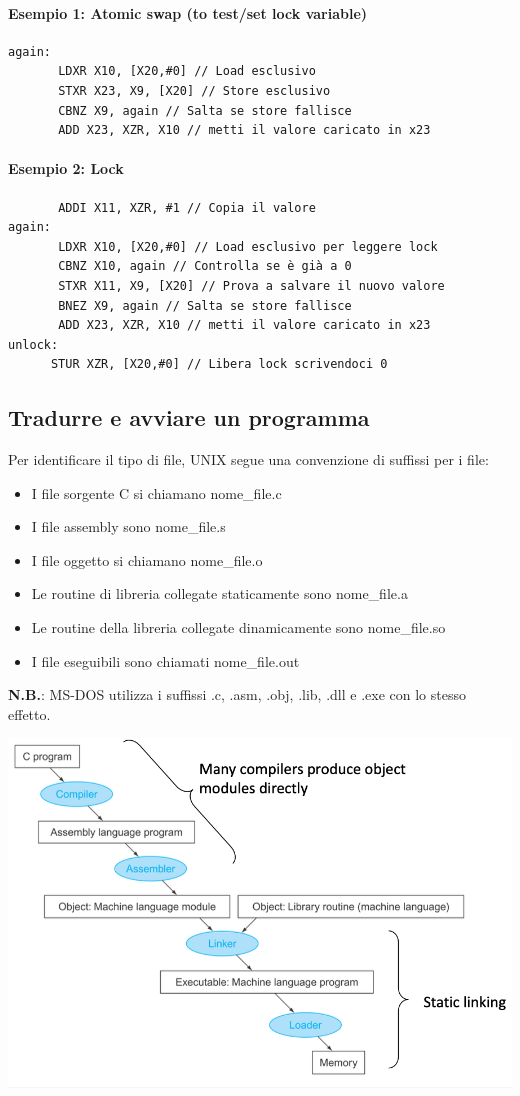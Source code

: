\documentclass[12pt,a4paper]{article}
\begin{document}
\paragraph{Esempio 1: Atomic swap (to test/set lock variable)}
\begin{verbatim}
again:
       LDXR X10, [X20,#0] // Load esclusivo
       STXR X23, X9, [X20] // Store esclusivo
       CBNZ X9, again // Salta se store fallisce
       ADD X23, XZR, X10 // metti il valore caricato in x23
\end{verbatim}

\paragraph{Esempio 2: Lock}
\begin{verbatim}
       ADDI X11, XZR, #1 // Copia il valore
again:
       LDXR X10, [X20,#0] // Load esclusivo per leggere lock
       CBNZ X10, again // Controlla se è già a 0
       STXR X11, X9, [X20] // Prova a salvare il nuovo valore
       BNEZ X9, again // Salta se store fallisce
       ADD X23, XZR, X10 // metti il valore caricato in x23
unlock:
      STUR XZR, [X20,#0] // Libera lock scrivendoci 0
\end{verbatim}

\subsection{Tradurre e avviare un programma}
Per identificare il tipo di file, UNIX segue una convenzione di suffissi per i file:
\begin{itemize}
\item I file sorgente C si chiamano nome\_file.c
\item I file assembly sono nome\_file.s
\item I file oggetto si chiamano nome\_file.o
\item Le routine di libreria collegate staticamente sono nome\_file.a
\item Le routine della libreria collegate dinamicamente sono nome\_file.so
\item I file eseguibili sono chiamati nome\_file.out
\end{itemize}
\textbf{N.B.}: MS-DOS utilizza i suffissi .c, .asm, .obj, .lib, .dll e .exe con lo stesso effetto.
\begin{center}
\includegraphics[width=0.7\columnwidth]{img/execution.png}
\end{center}
\end{document}
